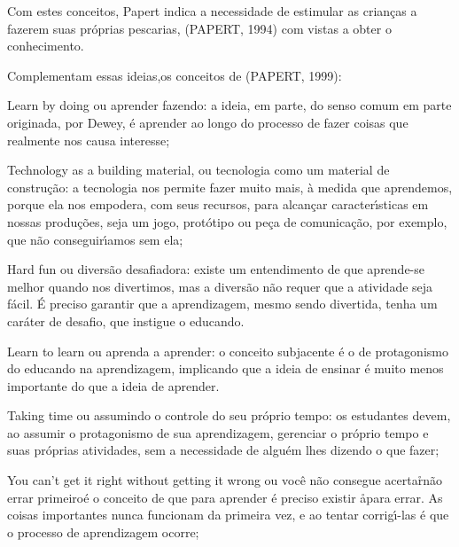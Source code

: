 \documentclass[
12pt,		%
openright,	%
twoside,  %
a4paper,			%
chapter=TITLE,		%
english,			%
french,				%
spanish,			%
brazil				%
]{USPSC-classe/USPSC}
\begin{document}
Com estes conceitos, Papert indica a necessidade de estimular as crian\c{c}as a fazerem suas pr\'oprias pescarias,  (PAPERT, 1994) com vistas a obter o conhecimento.








Complementam essas ideias,os conceitos de  (PAPERT, 1999):









\begin{alineas}
\item Learn by doing ou aprender fazendo: a ideia, em parte,  do senso comum em parte originada, por Dewey, \'e aprender ao longo do processo de fazer coisas que realmente nos causa interesse;
\item Technology as a building material, ou \textquotedbl tecnologia como um material de constru\c{c}\~ao\textquotedbl : a tecnologia nos permite fazer muito mais, \`a medida que aprendemos, porque ela nos empodera, com seus recursos, para alcan\c{c}ar caracter\'{\i}sticas em nossas produ\c{c}\~oes, seja um jogo, prot\'otipo ou pe\c{c}a de comunica\c{c}\~ao, por exemplo, que n\~ao conseguir\'{\i}amos sem ela;
\item Hard fun ou \textquotedbl divers\~ao desafiadora\textquotedbl : existe um entendimento de que aprende-se melhor quando nos divertimos, mas a divers\~ao n\~ao requer que a atividade seja f\'acil. \'E preciso garantir que a aprendizagem, mesmo sendo divertida, tenha um car\'ater de desafio, que instigue o educando.
\item Learn to learn ou \textquotedbl aprenda a aprender\textquotedbl : o conceito subjacente \'e o de protagonismo do educando na aprendizagem, implicando que a ideia de ensinar \'e muito menos importante do que a ideia de aprender.
\item Taking time ou \textquotedbl assumindo o controle do seu pr\'oprio tempo\textquotedbl : os estudantes devem, ao assumir o protagonismo de sua aprendizagem, gerenciar o pr\'oprio tempo e suas pr\'oprias atividades, sem a necessidade de algu\'em lhes dizendo o que fazer;
\item You can’t get it right without getting it wrong ou \textquotedbl voc\^e n\~ao consegue acertar\r\nse n\~ao errar primeiro\textquotedbl \'e o conceito de que para aprender \'e preciso existir a\r\nliberdade para errar. As coisas importantes nunca funcionam da primeira vez, e ao tentar corrig\'{\i}-las \'e que o processo de aprendizagem ocorre;

\end{alineas}
\end{document}
